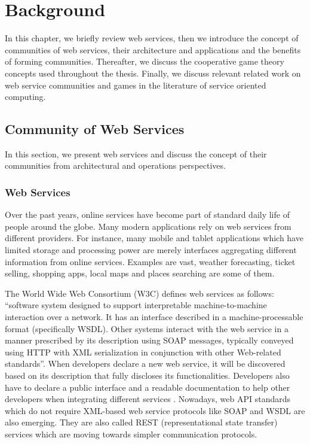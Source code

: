 \setcounter{chapter}{1}

\chapter{Background}\label{cha:background}
In this chapter, we briefly review web services, then we introduce
the concept of communities of web services, their architecture and
applications and the benefits of forming communities. Thereafter,
we discuss the cooperative game theory concepts used throughout
the thesis. Finally, we discuss relevant related work on web
service communities and games in the literature of service
oriented computing.

\section{Community of Web Services}\label{sec:CommunityWS}
In this section, we present web services and discuss the concept
of their communities from architectural and operations
perspectives.

\subsection{Web Services}\label{sec:CWSWebServices}
Over the past years, online services have become part of standard
daily life of people around the globe. Many modern applications
rely on web services from different providers. For instance, many
mobile and tablet applications which have limited storage and
processing power are merely interfaces aggregating different
information from online services. Examples are vast, weather
forecasting, ticket selling, shopping apps, local maps and places
searching are some of them.

The World Wide Web Consortium (W3C) defines web services as
follows: ``software system designed to support interpretable
machine-to-machine interaction over a network. It has an interface
described in a machine-processable format (specifically WSDL).
Other systems interact with the web service in a manner prescribed
by its description using SOAP messages, typically conveyed using
HTTP with XML serialization in conjunction with other Web-related
standards''. When developers declare a new web service, it will be
discovered based on its description that fully discloses its
functionalities. Developers also have to declare a public
interface and a readable documentation to help other developers
when integrating different services \cite{w3cwsdl}. Nowadays, web
API standards which do not require XML-based web service protocols
like SOAP and WSDL are also emerging. They are also called REST
(representational state transfer) services which are moving
towards simpler communication protocols. %

